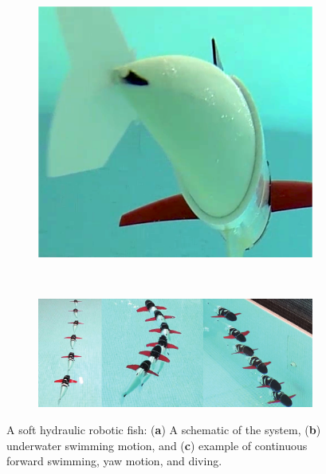 \begin{figure}[htb]
\begin{subfigure}[b]{0.48\columnwidth}
            \includegraphics[width=1\columnwidth]{figures/locomotion/hydraulic_fish_yaw.png}
            \caption{}
            \label{fig:hydraulic_fish_yaw}
        \end{subfigure}\\
        \begin{subfigure}[b]{1\columnwidth}
            \centering
            \includegraphics[width=1\columnwidth]{figures/locomotion/hydraulic_fish_all_motions.pdf}
            \caption{}
            \label{fig:hydraulic_fish_all_motions}
        \end{subfigure}%
        \caption[Hydraulic soft robotic fish]{A soft hydraulic robotic fish: (\textbf{a}) A schematic of the system, (\textbf{b}) underwater swimming motion, and (\textbf{c}) example of continuous forward swimming, yaw motion, and diving.}
\end{figure} 